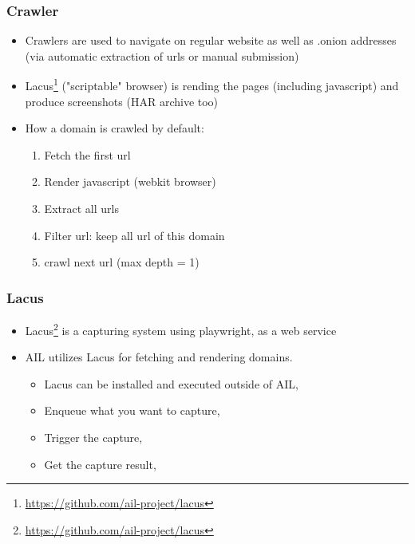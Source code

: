 \documentclass[10pt,aspectratio=169, colorlinks=true, linkcolor=circlBlue]{beamer}
\begin{document}
\begin{frame}
        \frametitle {Crawler}
        \begin{itemize}
                \item Crawlers are used to navigate on regular website as well as .onion addresses (via automatic extraction of urls or manual submission)
                \item Lacus\footnote{\url{https://github.com/ail-project/lacus}} ("scriptable" browser) is rending the pages (including javascript) and produce screenshots (HAR archive too)
                \item How a domain is crawled by default:
		\begin{enumerate}
		    \item Fetch the first url
            \item Render javascript (webkit browser)
		    \item Extract all urls
		    \item Filter url: keep all url of this domain
		    \item crawl next url (max depth = 1)
		\end{enumerate}
        \end{itemize}
\end{frame}

\begin{frame}
    \frametitle{Lacus}
    	\begin{itemize}
            \item Lacus\footnote{\url{https://github.com/ail-project/lacus}} is a capturing system using playwright, as a web service
		    \item AIL utilizes Lacus for fetching and rendering domains.
			\begin{itemize}
				\item Lacus can be installed and executed outside of AIL,
				\item Enqueue what you want to capture,
				\item Trigger the capture,
				\item Get the capture result,
			\end{itemize}
        \end{itemize}
\end{frame}
\end{document}
